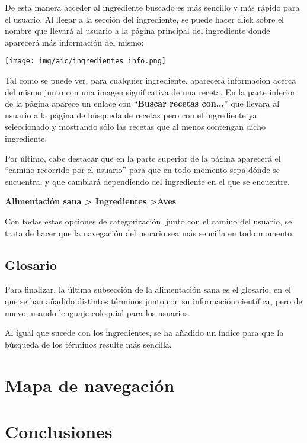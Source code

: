 \documentclass{\ClassPath/viu-tfm-template}
\begin{document}
De esta manera acceder al ingrediente buscado es más sencillo y más rápido para el usuario. Al llegar a la sección del ingrediente, se puede hacer click sobre el nombre que llevará al usuario a la página principal del ingrediente donde aparecerá más información del mismo:

\begin{center}
    \vspace{-10pt}
    \texttt{[image: img/aic/ingredientes\_info.png]}
    \vspace{-20pt}
\end{center}

Tal como se puede ver, para cualquier ingrediente, aparecerá información acerca del mismo junto con una imagen significativa de una receta. En la parte inferior de la página aparece un enlace con “\textbf{{\color{maincolor}Buscar recetas con...}}” que llevará al usuario a la página de búsqueda de recetas pero con el ingrediente ya seleccionado y mostrando sólo las recetas que al menos contengan dicho ingrediente.

Por último, cabe destacar que en la parte superior de la página aparecerá el “camino recorrido por el usuario” para que en todo momento sepa dónde se encuentra, y que cambiará dependiendo del ingrediente en el que se encuentre.

\begin{center}
    \vspace{-10pt}
    \textbf{{\color{maincolor}Alimentación sana > \space Ingredientes} >\space Aves}
    \vspace{-15pt}
\end{center}

Con todas estas opciones de categorización, junto con el camino del usuario, se trata de hacer que la navegación del usuario sea más sencilla en todo momento.


\section{Glosario}
Para finalizar, la última subsección de la alimentación sana es el glosario, en el que se han añadido distintos términos junto con su información científica, pero de nuevo, usando lenguaje coloquial para los usuarios.

Al igual que sucede con los ingredientes, se ha añadido un índice para que la búsqueda de los términos resulte más sencilla.



\chapter{Mapa de navegación}





\chapter{Conclusiones}




\end{document}
